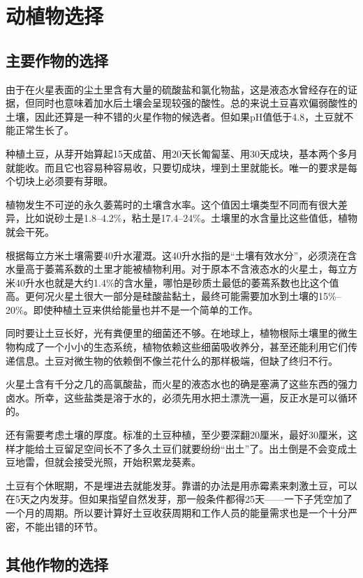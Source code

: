 \chapter{动植物选择}
\label{chp:plant:begin}

\section{主要作物的选择}
由于在火星表面的尘土里含有大量的硫酸盐和氯化物盐，这是液态水曾经存在的证据，但同时也意味着加水后土壤会呈现较强的酸性。总的来说土豆喜欢偏弱酸性的土壤，因此还算是一种不错的火星作物的候选者。但如果pH值低于4.8，土豆就不能正常生长了。

种植土豆，从芽开始算起15天成苗、用20天长匍匐茎、用30天成块，基本两个多月就能收。而且它也容易种容易收，只要切成块，埋到土里就能长。唯一的要求是每个切块上必须要有芽眼。

植物发生不可逆的永久萎蔫时的土壤含水率。这个值因土壤类型不同而有很大差异，比如说砂土是1.8--4.2\%，粘土是17.4--24\%。土壤里的水含量比这些值低，植物就会干死。

根据每立方米土壤需要40升水灌溉。这40升水指的是“土壤有效水分”，必须浇在含水量高于萎蔫系数的土里才能被植物利用。对于原本不含液态水的火星土，每立方米40升水也就是大约1.4\%的含水量，哪怕是砂质土最低的萎蔫系数也比这个值高。更何况火星土很大一部分是硅酸盐黏土，最终可能需要加水到土壤的15\%--20\%。即使种植土豆来供给能量也并不是一个简单的工作。

同时要让土豆长好，光有粪便里的细菌还不够。在地球上，植物根际土壤里的微生物构成了一个小小的生态系统，植物依赖这些细菌吸收养分，甚至还能利用它们传递信息。土豆对微生物的依赖倒不像兰花什么的那样极端，但缺了终归不行。

火星土含有千分之几的高氯酸盐，而火星的液态水也的确是塞满了这些东西的强力卤水。所幸，这些盐类是溶于水的，必须先用水把土漂洗一遍，反正水是可以循环的。

还有需要考虑土壤的厚度。标准的土豆种植，至少要深翻20厘米，最好30厘米，这样才能给土豆留足空间长不了多久土豆们就要纷纷“出土”了。出土倒是不会变成土豆地雷，但就会接受光照，开始积累龙葵素。

土豆有个休眠期，不是埋进去就能发芽。靠谱的办法是用赤霉素来刺激土豆，可以在5天之内发芽。但如果指望自然发芽，那一般条件都得25天——一下子凭空加了一个月的周期。所以要计算好土豆收获周期和工作人员的能量需求也是一个十分严密，不能出错的环节。

\section{其他作物的选择}
